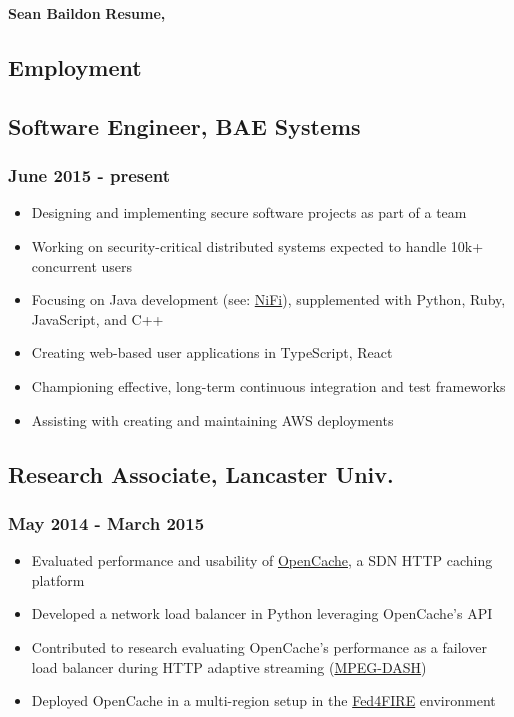 \documentclass[a4paper,11pt]{article}
\begin{document}
\large
\noindent\textbf{Sean Baildon}
\hfill
\noindent\textbf{Resume, \the\year}
\normalsize

\vspace{4ex}
\hrulefill
\vspace{3ex}

\begin{multicols*}{2}

\section*{Employment}
\subsection*{Software Engineer, BAE Systems}
\subsubsection*{June 2015 - present}
\begin{itemize}[leftmargin=*]
	\item Designing and implementing secure software projects as part of a team
	\item Working on security-critical distributed systems expected to handle 10k+ concurrent users
	\item Focusing on Java development (see: \href{https://nifi.apache.org}{NiFi}), supplemented with Python, Ruby, JavaScript, and C++
	\item Creating web-based user applications in TypeScript, React
	\item Championing effective, long-term continuous integration and test frameworks
	\item Assisting with creating and maintaining AWS deployments
\end{itemize}

\subsection*{Research Associate, Lancaster Univ.}
\subsubsection*{May 2014 - March 2015}
\begin{itemize}[leftmargin=*]
	\item Evaluated performance and usability of \href{https://github.com/broadbent/opencache}{OpenCache}, a SDN HTTP caching platform
	\item Developed a network load balancer in Python leveraging OpenCache's API
	\item Contributed to research evaluating OpenCache's performance as a failover load balancer during HTTP adaptive streaming (\href{https://en.wikipedia.org/wiki/Dynamic_Adaptive_Streaming_over_HTTP}{MPEG-DASH})
	\item Deployed OpenCache in a multi-region setup in the \href{https://www.fed4fire.eu}{Fed4FIRE} environment
\end{itemize}


\end{multicols*}
\end{document}
